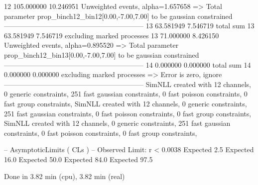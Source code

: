 12         105.000000      10.246951       Unweighted events, alpha=1.657658
  => Total parameter prop_binch12_bin12[0.00,-7.00,7.00] to be gaussian constrained
------------------------------------------------------------
13         63.581949       7.546719        total sum                     
13         63.581949       7.546719        excluding marked processes    
13         71.000000       8.426150        Unweighted events, alpha=0.895520
  => Total parameter prop_binch12_bin13[0.00,-7.00,7.00] to be gaussian constrained
------------------------------------------------------------
14         0.000000        0.000000        total sum                     
14         0.000000        0.000000        excluding marked processes    
  => Error is zero, ignore      
------------------------------------------------------------
SimNLL created with 12 channels, 0 generic constraints, 251 fast gaussian constraints, 0 fast poisson constraints, 0 fast group constraints, 
SimNLL created with 12 channels, 0 generic constraints, 251 fast gaussian constraints, 0 fast poisson constraints, 0 fast group constraints, 
SimNLL created with 12 channels, 0 generic constraints, 251 fast gaussian constraints, 0 fast poisson constraints, 0 fast group constraints, 

 -- AsymptoticLimits ( CLs ) --
Observed Limit: r < 0.0038
Expected  2.5%
Expected 16.0%
Expected 50.0%
Expected 84.0%
Expected 97.5%

Done in 3.82 min (cpu), 3.82 min (real)

